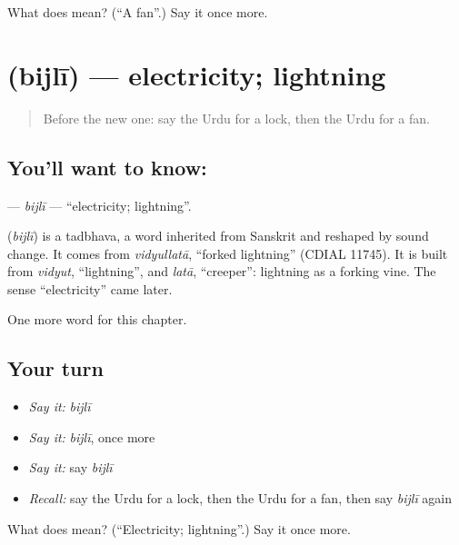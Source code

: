 \begin{tcolorbox}[breakable,colback=teal!4,colframe=teal!35!black,title={Before you move on}]
What does  mean? (\textquotedblleft{}A fan\textquotedblright{}.) Say it once more.
\end{tcolorbox}
\section[\texorpdfstring{\ur{بجلی} (bijlī)}{بجلی (bijlī)}]{ (bijlī) — electricity; lightning}

\label{lesson:UR-C108-bijli}



\begin{quote}
Before the new one: say the Urdu for a lock, then the Urdu for a fan.
\end{quote}

\subsection*{You'll want to know: }
\textbf{} — \emph{bijlī} — \textquotedblleft{}electricity; lightning\textquotedblright{}.

\begin{cousinweb}
\textbf{} (\emph{bijlī}) is a tadbhava, a word inherited from Sanskrit and reshaped by sound change. It comes from \emph{vidyullatā}, \textquotedblleft{}forked lightning\textquotedblright{} (CDIAL 11745). It is built from \emph{vidyut}, \textquotedblleft{}lightning\textquotedblright{}, and \emph{latā}, \textquotedblleft{}creeper\textquotedblright{}: lightning as a forking vine. The sense \textquotedblleft{}electricity\textquotedblright{} came later.
\end{cousinweb}

\begin{grammarlens}[title={What you've built}]
One more word for this chapter.
\end{grammarlens}

\subsection*{Your turn}
\begin{itemize}
\raggedright
  \item \emph{Say it:} \emph{bijlī}
  \item \emph{Say it:} \emph{bijlī}, once more
  \item \emph{Say it:} say \emph{bijlī}
  \item \emph{Recall:} say the Urdu for a lock, then the Urdu for a fan, then say \emph{bijlī} again
\end{itemize}

\begin{tcolorbox}[breakable,colback=teal!4,colframe=teal!35!black,title={Before you move on}]
What does  mean? (\textquotedblleft{}Electricity; lightning\textquotedblright{}.) Say it once more.
\end{tcolorbox}
